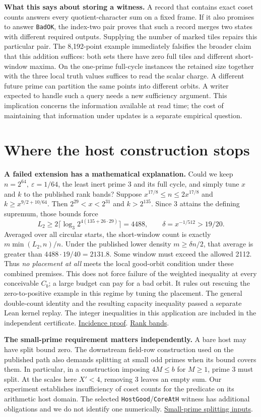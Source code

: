 \documentclass[11pt,letterpaper]{article}
\newcommand{\orig}[3]{\href{https://github.com/nousentllc/riemann-hypothesis/blob/40e56bab026552e089d7afcfeff08d2defb9c005/src/#1.lean\#L#2}{#3}}
\newcommand{\loc}[2]{\href{run:evidence/#1}{#2}}
\newcommand{\pp}[1]{\par\medskip\noindent\textbf{#1}\enspace}
\newcommand{\nextsection}[1]{\clearpage\section{#1}}
\begin{document}
\pp{What this says about storing a witness.} A record that contains exact coset counts answers every quotient-character sum on a fixed frame. If it also promises to answer \texttt{BadOK}, the index-two pair proves that such a record merges two states with different required outputs. Supplying the number of marked tiles repairs this particular pair. The 8,192-point example immediately falsifies the broader claim that this addition suffices: both sets there have zero full tiles and different short-window maxima. On the one-prime full-cycle instances the retained size together with the three local truth values suffices to read the scalar charge. A different future prime can partition the same points into different orbits. A writer expected to handle such a query needs a new sufficiency argument. This implication concerns the information available at read time; the cost of maintaining that information under updates is a separate empirical question.

\nextsection{Where the host construction stops}
\pp{A failed extension has a mathematical explanation.}
Could we keep \(n=2^{64},\ \varepsilon=1/64\), the least inert prime 3 and its full cycle, and simply tune \(x\) and \(k\) to the published rank bands? Suppose \(x^{17/8}\le n\le2x^{17/8}\) and \(k\ge x^{9/2+10/64}\). Then \(2^{29}<x<2^{31}\) and \(k>2^{135}\). Since 3 attains the defining supremum, those bounds force
\[
 L_2\ge 2\lceil\log_3 2^{4(135+26\cdot29)}\rceil=4488,\qquad
 \delta=x^{-1/512}>19/20 .
\]
Averaged over all circular starts, the short-window count is exactly \(m\min(L_2,n)/n\). Under the published lower density \(m\ge\delta n/2\), that average is greater than \(4488\cdot19/40=2131.8\). Some window must exceed the allowed 2112. Thus \emph{no placement at all} meets the local good-orbit condition under these combined premises. This does not force failure of the weighted inequality at every conceivable \(C_b\); a large budget can pay for a bad orbit. It rules out rescuing the zero-to-positive example in this regime by tuning the placement. The general double-count identity and the resulting capacity inequality passed a separate Lean kernel replay. The integer inequalities in this application are included in the independent certificate. \loc{incidence/WindowIncidence.lean}{Incidence proof}. \orig{Development/AbelianVarietyTheory/Definitions/GlobalTwisting/PairRowIffQdRows}{28}{Rank bands}.

\pp{The small-prime requirement matters independently.} A bare host may have split bound zero. The downstream field-row construction used on the published path also demands splitting at small odd primes when its bound covers them. In particular, in a construction imposing \(4M\le b\) for \(M\ge1\), prime 3 must split. At the scales here \(X'<4\), removing 3 leaves an empty sum. Our experiment establishes insufficiency of coset counts for the predicate on its arithmetic host domain. The selected \texttt{HostGood}/\texttt{CoreAtH} witness has additional obligations and we do not identify one numerically. \orig{Development/AutomorphicArithmetic/CoprimeRanks/FieldAny}{23}{Small-prime splitting inputs}.
\end{document}
